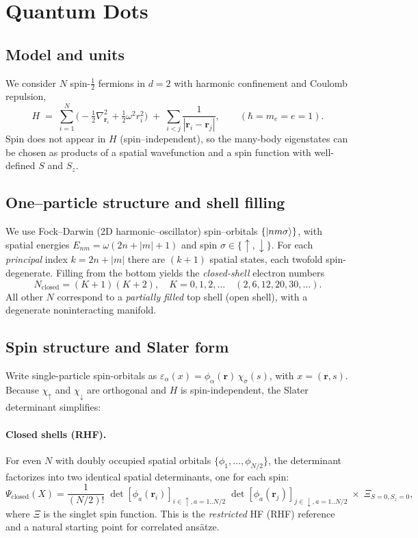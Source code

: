 \section{Quantum Dots}

\subsection{Model and units}
We consider $N$ spin-$\tfrac12$ fermions in $d{=}2$ with harmonic confinement and Coulomb repulsion,
\[
H \;=\; \sum_{i=1}^N\!\bigg(-\tfrac12\nabla_{\mathbf r_i}^2 + \tfrac12 \omega^2 r_i^2\bigg)
\;+\;\sum_{i<j}\frac{1}{|\mathbf r_i-\mathbf r_j|}, \qquad (\hbar=m_e=e=1).
\]
Spin does not appear in $H$ (spin–independent), so the many-body eigenstates can be chosen as
products of a spatial wavefunction and a spin function with well-defined $S$ and $S_z$.

\subsection{One–particle structure and shell filling}
We use Fock–Darwin (2D harmonic–oscillator) spin–orbitals $\{\ket{n m \sigma}\}$,
with spatial energies $E_{n m}=\omega (2n+|m|+1)$ and spin $\sigma\in\{\uparrow,\downarrow\}$.
For each \emph{principal} index $k=2n+|m|$ there are $(k{+}1)$ spatial states, each
twofold spin-degenerate. Filling from the bottom yields the \emph{closed-shell} electron numbers
\[
N_{\mathrm{closed}}=(K{+}1)(K{+}2), \quad K=0,1,2,\dots \quad (2,6,12,20,30,\dots).
\]
All other $N$ correspond to a \emph{partially filled} top shell (open shell), with a degenerate
noninteracting manifold.

\subsection{Spin structure and Slater form}
Write single-particle spin-orbitals as $\varepsilon_\alpha(x)=\phi_\alpha(\mathbf r)\,\chi_{\sigma}(s)$,
with $x=(\mathbf r,s)$. Because $\chi_\uparrow$ and $\chi_\downarrow$ are orthogonal and $H$ is
spin-independent, the Slater determinant simplifies:

\paragraph{Closed shells (RHF).}
For even $N$ with doubly occupied spatial orbitals
$\{\phi_1,\ldots,\phi_{N/2}\}$, the determinant factorizes into two identical spatial determinants,
one for each spin:
\[
\Psi_{\mathrm{closed}}(X)
=\frac{1}{(N/2)!}\;
\det[\phi_a(\mathbf r_i)]_{i\in\uparrow,a=1..N/2}\;
\det[\phi_a(\mathbf r_j)]_{j\in\downarrow,a=1..N/2}\;\times\; \Xi_{S=0,S_z=0},
\]
where $\Xi$ is the singlet spin function. This is the \emph{restricted} HF (RHF) reference and a
natural starting point for correlated ansätze.

